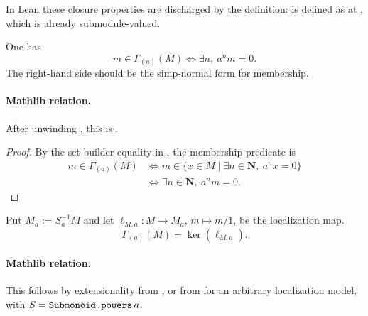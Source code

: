 \begin{remark}
  \leanok
  In Lean these closure properties are discharged by the definition:
  \texttt{} is defined as
  \texttt{} at
  \texttt{}, which is already submodule-valued.
\end{remark}

\begin{lemma}
  \label{lemma:nagata-mem-power-torsion}
  \leanok

  One has
  \[
    m\in\Gamma_{(a)}(M)
      \Longleftrightarrow
    \exists n,\ a^nm=0.
  \]
  The right-hand side should be the simp-normal form for membership.

  \paragraph{Mathlib relation.}
  After unwinding \texttt{}, this is
  \texttt{}.
\end{lemma}

\begin{proof}
  \leanok
  By the set-builder equality in , the
  membership predicate is
  \[
  \begin{aligned}
    m\in\Gamma_{(a)}(M)
      &\Longleftrightarrow
        m\in\{x\in M\mid\exists n\in\mathbf N,\ a^nx=0\}\\
      &\Longleftrightarrow
        \exists n\in\mathbf N,\ a^nm=0.
  \end{aligned}
  \]
\end{proof}

\begin{lemma}
  \label{lemma:nagata-power-torsion-kernel-localization}
  \leanok

  Put $M_a:=S_a^{-1}M$ and let
  $\ell_{M,a}\colon M\to M_a$, $m\mapsto m/1$, be the localization map.
  \[
    \Gamma_{(a)}(M)=\ker(\ell_{M,a}).
  \]

  \paragraph{Mathlib relation.}
  This follows by extensionality from
  \texttt{}, or from
  \texttt{} for an arbitrary
  localization model, with
  $S=\texttt{\detokenize{Submonoid.powers}}\,a$.
\end{lemma}

